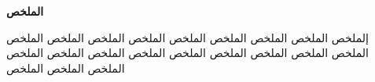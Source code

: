 \documentclass[sommairechap,stylejchiquet]{these_gi}
\begin{document}
\beforepreface
 

 
\tableofcontents
 
\listoffigures
\listoftables
\afterpreface
 
\adjustmtc

\adjustmtc
 \adjustmtc
    
	
 
%	
%
%
 
%
 
% 


%



 

  
 



\begin{arabtex}
\begin{center}

\textbf{  الملخص    } 
\end{center}

إلملخص     الملخص     الملخص     الملخص     الملخص     الملخص     الملخص     الملخص     الملخص     الملخص     الملخص     الملخص     الملخص     الملخص     الملخص     الملخص     الملخص     الملخص     الملخص     الملخص     الملخص    

\end{arabtex}
\end{document}
